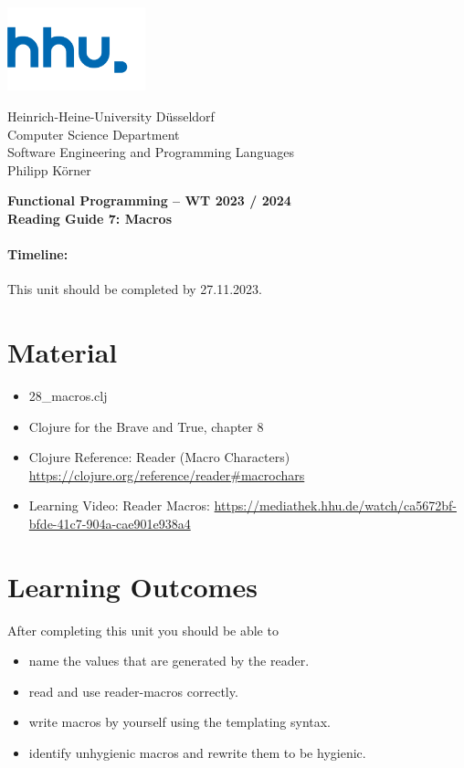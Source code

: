 \documentclass[11pt,a4paper]{article}
\begin{document}
\begin{minipage}[b]{\textwidth}
	\parbox[t]{5cm}{%
		\includegraphics[width=4cm]{unilogo}
		\hfill
	}
	\parbox[b]{11cm}{%
		Heinrich-Heine-University D\"usseldorf\\
		Computer Science Department\\
		Software Engineering and Programming Languages\\
		Philipp K\"orner
	}
\end{minipage}
\begin{center}
	\bf
	Functional Programming -- WT 2023 / 2024\\
	Reading Guide 7: Macros
\end{center}

\pagestyle{empty}

\paragraph{Timeline:} This unit should be completed by 27.11.2023.

\section{Material} 

\begin{itemize}
    \item 28\_macros.clj
	\item Clojure for the Brave and True, chapter 8
	\item Clojure Reference: Reader (Macro Characters) \url{https://clojure.org/reference/reader#macrochars}
    \item Learning Video: Reader Macros: \url{https://mediathek.hhu.de/watch/ca5672bf-bfde-41c7-904a-cae901e938a4}
\end{itemize}


\section{Learning Outcomes}

After completing this unit you should be able to

\begin{itemize}
    \item name the values that are generated by the reader.
    \item read and use reader-macros correctly.
    \item write macros by yourself using the templating syntax.
    \item identify unhygienic macros and rewrite them to be hygienic.
\end{itemize}
\end{document}
